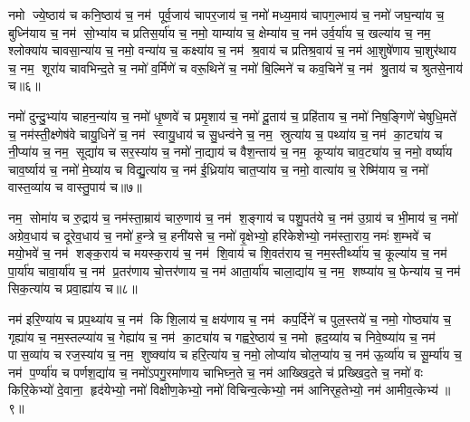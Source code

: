नमो ज्ये॒ष्ठाय॑ च कनि॒ष्ठाय॑ च॒ नम॑ पूर्व॒जाय॑ चापर॒जाय॑ च॒ नमो॑ मध्य॒माय॑ चापग॒ल्भाय॑ च॒ नमो॑ जघ॒न्या॑य च॒ बुध्नि॑याय च॒ नम॑ सो॒भ्या॑य च प्रतिस॒र्या॑य च॒ नमो॒ याम्या॑य च॒ क्षेम्या॑य च॒ नम॑ उर्व॒र्या॑य च॒ खल्या॑य च॒ नम॒ श्लोक्या॑य चावसा॒न्या॑य च॒ नमो॒ वन्या॑य च॒ कक्ष्या॑य च॒ नम॑ श्र॒वाय॑ च प्रतिश्र॒वाय॑ च॒ नम॑ आ॒शुषे॑णाय चा॒शुर॑थाय च॒ नम॒ शूरा॑य चावभिन्द॒ते च॒ नमो॑ व॒र्मिणे॑ च वरू॒थिने॑ च॒ नमो॑ बि॒ल्मिने॑ च कव॒चिने॑ च॒ नम॑ श्रु॒ताय॑ च श्रुतसे॒नाय॑ च॥६॥ 

नमो॑ दुन्दु॒भ्या॑य चाहन॒न्या॑य च॒ नमो॑ धृ॒ष्णवे॑ च प्रमृ॒शाय॑ च॒ नमो॑ दू॒ताय॑ च॒ प्रहि॑ताय च॒ नमो॑ निष॒ङ्गिणे॑ चेषुधि॒मते॑ च॒ नम॑स्ती॒क्ष्णेष॑वे चायु॒धिने॑ च॒ नम॑ स्वायु॒धाय॑ च सु॒धन्व॑ने च॒ नम॒ स्रुत्या॑य च॒ पथ्या॑य च॒ नम॑ का॒ट्या॑य च नी॒प्या॑य च॒ नम॒ सूद्या॑य च सर॒स्या॑य च॒ नमो॑ ना॒द्याय॑ च वैश॒न्ताय॑ च॒ नम॒ कूप्या॑य चाव॒ट्या॑य च॒ नमो॒ वर्ष्या॑य चाव॒र्ष्याय॑ च॒ नमो॑ मे॒घ्या॑य च विद्यु॒त्या॑य च॒ नम॑ ई॒ध्रिया॑य चात॒प्या॑य च॒ नमो॒ वात्या॑य च॒ रेष्मि॑याय च॒ नमो॑ वास्त॒व्या॑य च वास्तु॒पाय॑ च॥७॥ 

नम॒ सोमा॑य च रु॒द्राय॑ च॒ नम॑स्ता॒म्राय॑ चारु॒णाय॑ च॒ नम॑ श॒ङ्गाय॑ च पशु॒पत॑ये च॒ नम॑ उ॒ग्राय॑ च भी॒माय॑ च॒ नमो॑ अग्रेव॒धाय॑ च दूरेव॒धाय॑ च॒ नमो॑ ह॒न्त्रे च॒ हनी॑यसे च॒ नमो॑ वृ॒क्षेभ्यो॒ हरि॑केशेभ्यो॒ नम॑स्ता॒राय॒ नमः॑  श॒म्भवे॑ च मयो॒भवे॑ च॒ नम॑ शङ्क॒राय॑ च मयस्क॒राय॑ च॒ नम॑ शि॒वाय॑ च शि॒वत॑राय च॒ नम॒स्तीर्थ्या॑य च॒ कूल्या॑य च॒ नम॑ पा॒र्या॑य चावा॒र्या॑य च॒ नम॑ प्र॒तर॑णाय चो॒त्तर॑णाय च॒ नम॑ आता॒र्या॑य चाला॒द्या॑य च॒ नम॒ शष्प्या॑य च॒ फेन्या॑य च॒ नम॑ सिक॒त्या॑य च प्रवा॒ह्या॑य च॥८॥ 

नम॑ इरि॒ण्या॑य च प्रप॒थ्या॑य च॒ नम॑ किशि॒लाय॑ च॒ क्षय॑णाय च॒ नम॑ कप॒र्दिने॑ च पुल॒स्तये॑ च॒ नमो॒ गोष्ठ्या॑य च॒ गृह्या॑य च॒ नम॒स्तल्प्या॑य च॒ गेह्या॑य च॒ नम॑ का॒ट्या॑य च गह्वरे॒ष्ठाय॑ च॒ नमो ह्रद॒य्या॑य च निवे॒ष्प्या॑य च॒ नम॑ पास॒व्या॑य च रज॒स्या॑य च॒ नम॒ शुष्क्या॑य च हरि॒त्या॑य च॒ नमो॒ लोप्या॑य चोल॒प्या॑य च॒ नम॑ ऊ॒र्व्या॑य च सू॒र्म्या॑य च॒ नम॑ प॒र्ण्या॑य च पर्णश॒द्या॑य च॒ नमो॑ऽपगु॒रमा॑णाय चाभिघ्न॒ते च॒ नम॑ आख्खिद॒ते च॑ प्रख्खिद॒ते च॒ नमो॑ वः किरि॒केभ्यो॑ दे॒वाना॒ हृद॑येभ्यो॒ नमो॑ विक्षीण॒केभ्यो॒ नमो॑ विचिन्व॒त्केभ्यो॒ नम॑ आनिर्‌ह॒तेभ्यो॒ नम॑ आमीव॒त्केभ्य॑॥९॥ 

